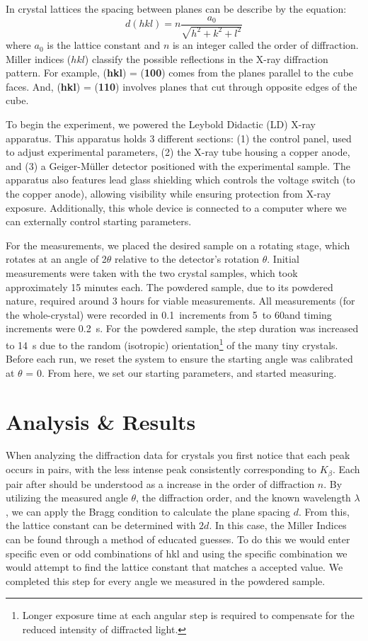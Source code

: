 \documentclass[a4paper,12pt,english]{all-in-one} %
\begin{document}
\begin{multicols}{2}
{In crystal lattices the spacing between planes can be describe by the equation:
\begin{equation}\label{eq:2}
 d(hkl) = n\frac{a_0}{\sqrt{h^2+k^2+l^2}}
\end{equation}
where $a_0$ is the lattice constant and $n$ is an integer called the order of diffraction. Miller indices ($hkl$) classify the possible reflections in the X-ray diffraction pattern. For example, (\textbf{hkl}) = (\textbf{100}) comes from the planes parallel to the cube faces. And, (\textbf{hkl}) = (\textbf{110}) involves planes that cut through opposite edges of the cube.

To begin the experiment, we powered the Leybold Didactic (LD) X-ray apparatus. This apparatus holds 3 different sections: (1) the control panel, used to adjust experimental parameters, (2) the X-ray tube housing a copper anode, and (3) a Geiger-Müller detector positioned with the experimental sample. The apparatus also features lead glass shielding which controls the voltage switch (to the copper anode), allowing visibility while ensuring protection from X-ray exposure. Additionally, this whole device is connected to a computer where we can externally control starting parameters. 

For the measurements, we placed the desired sample on a rotating stage, which rotates at an angle of 2$\theta$ relative to the detector’s rotation $\theta$. Initial measurements were taken with the two crystal samples, which took approximately 15 minutes each. The powdered sample, due to its powdered nature, required around 3 hours for viable measurements. All measurements (for the whole-crystal) were recorded in 0.1\textdegree\ increments from 5\textdegree\ to 60\textdegree and timing increments were \SI{0.2}{\second}. For the powdered sample, the step duration was increased to \SI{14}{\second} due to the random (isotropic) orientation\footnote{Longer exposure time at each angular step is required to compensate for the reduced intensity of diffracted light.} of the many tiny crystals. Before each run, we reset the system to ensure the starting angle was calibrated at $\theta$ = 0. From here, we set our starting parameters, and started measuring. 
}
    
\section*{Analysis \& Results}
{
When analyzing the diffraction data for crystals you first notice that each peak occurs in pairs, with the less intense peak consistently corresponding to $K_\beta$. Each pair after should be understood as a increase in the order of diffraction $n$. By utilizing the measured angle $\theta$, the diffraction order, and the known wavelength $\lambda$, we can apply the Bragg condition to calculate the plane spacing $d$. From this, the lattice constant can be determined with $2d$. In this case, the Miller Indices can be found through a method of educated guesses. To do this we would enter specific even or odd combinations of hkl and using the specific combination we would attempt to find the lattice constant that matches a accepted value. We completed this step for every angle we measured in the powdered sample.

}
\end{multicols}
\end{document}
